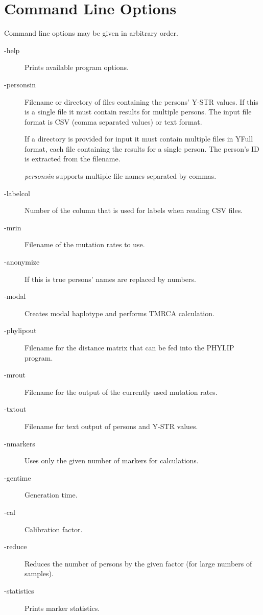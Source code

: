 \section{Command Line Options}

Command line options may be given in arbitrary order.

\begin{description}
\item[-help] Prints available program options.
\item[-personsin] Filename or directory of files containing the
	persons' Y-STR values. If this is a single file it must contain
	results for multiple persons. The input file format is CSV
    (comma separated values) or text format.

	If a directory is provided for input it must contain multiple
	files in YFull format, each file containing the results for
	a single person. The person's ID is extracted from the filename.

	\emph{personsin} supports multiple file names separated by
	commas.
\item[-labelcol] Number of the column that is used for labels
	when reading CSV files.
\item[-mrin] Filename of the mutation rates to use.
\item[-anonymize] If this is true persons' names are replaced by numbers.
\item[-modal] Creates modal haplotype and performs TMRCA calculation.
\item[-phylipout] Filename for the distance matrix that can be fed into
	the PHYLIP\cite{Phylip} program.
\item[-mrout] Filename for the output of the currently used mutation rates.
\item[-txtout] Filename for text output of persons and Y-STR values.
\item[-nmarkers] Uses only the given number of markers for calculations.
\item[-gentime] Generation time.
\item[-cal] Calibration factor.
\item[-reduce] Reduces the number of persons by the given factor
	 (for large numbers of samples).
\item[-statistics] Prints marker statistics.
\end{description}

